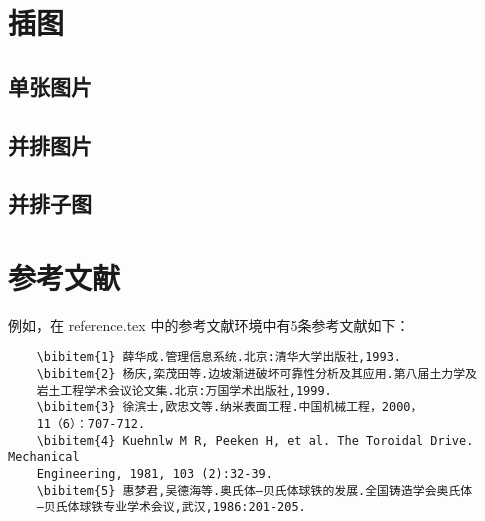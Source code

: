 \section{插图}

    \subsection{单张图片}


    \subsection{并排图片}


    \subsection{并排子图}



\section{参考文献}

    例如，在 reference.tex 中的参考文献环境中有5条参考文献如下：

    \begin{verbatim}
    \bibitem{1} 薛华成.管理信息系统.北京:清华大学出版社,1993.
    \bibitem{2} 杨庆,栾茂田等.边坡渐进破坏可靠性分析及其应用.第八届土力学及
    岩土工程学术会议论文集.北京:万国学术出版社,1999.
    \bibitem{3} 徐滨士,欧忠文等.纳米表面工程.中国机械工程，2000，
    11（6）：707-712.
    \bibitem{4} Kuehnlw M R, Peeken H, et al. The Toroidal Drive. Mechanical
    Engineering, 1981, 103 (2):32-39.
    \bibitem{5} 惠梦君,吴德海等.奥氏体—贝氏体球铁的发展.全国铸造学会奥氏体
    —贝氏体球铁专业学术会议,武汉,1986:201-205.
    \end{verbatim}


